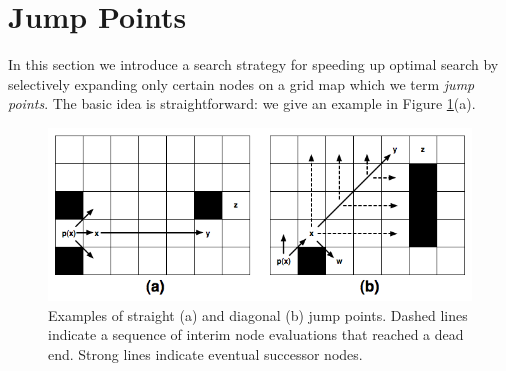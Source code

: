 \section{Jump Points}
In this section we introduce a search strategy for speeding up
optimal search by selectively expanding only certain nodes on a grid map
which we term \emph{jump points}.
The basic idea is straightforward: we give an example in Figure 
\ref{fig:jumppoints}(a).

\begin{figure}[tb]
       \begin{center}
		   \includegraphics[width=0.95\columnwidth, trim = 10mm 10mm 10mm 0mm]
			{diagrams/jumppoints.png}
       \end{center}
	\vspace{-3pt}
       \caption{Examples of straight (a) and diagonal (b) jump points.
Dashed lines indicate a sequence of interim node evaluations that reached
a dead end. Strong lines indicate eventual successor nodes.}
       \label{fig:jumppoints}
\end{figure}

